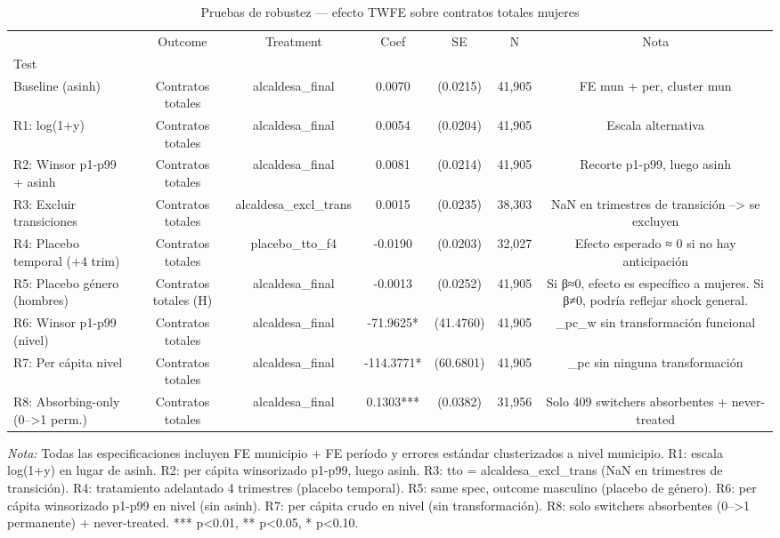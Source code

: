 \begin{table}[htbp]
\centering
\small
\caption{Pruebas de robustez — efecto TWFE sobre contratos totales mujeres}
\label{tab:robustness}
\begin{tabular}{lcccccc}
\toprule
 & Outcome & Treatment & Coef & SE & N & Nota \\
Test &  &  &  &  &  &  \\
\midrule
Baseline (asinh) & Contratos totales & alcaldesa\_final & 0.0070 & (0.0215) & 41,905 & FE mun + per, cluster mun \\
R1: log(1+y) & Contratos totales & alcaldesa\_final & 0.0054 & (0.0204) & 41,905 & Escala alternativa \\
R2: Winsor p1-p99 + asinh & Contratos totales & alcaldesa\_final & 0.0081 & (0.0214) & 41,905 & Recorte p1-p99, luego asinh \\
R3: Excluir transiciones & Contratos totales & alcaldesa\_excl\_trans & 0.0015 & (0.0235) & 38,303 & NaN en trimestres de transición --> se excluyen \\
R4: Placebo temporal (+4 trim) & Contratos totales & placebo\_tto\_f4 & -0.0190 & (0.0203) & 32,027 & Efecto esperado ≈ 0 si no hay anticipación \\
R5: Placebo género (hombres) & Contratos totales (H) & alcaldesa\_final & -0.0013 & (0.0252) & 41,905 & Si β≈0, efecto es específico a mujeres. Si β≠0, podría reflejar shock general. \\
R6: Winsor p1-p99 (nivel) & Contratos totales & alcaldesa\_final & -71.9625* & (41.4760) & 41,905 & _pc_w sin transformación funcional \\
R7: Per cápita nivel & Contratos totales & alcaldesa\_final & -114.3771* & (60.6801) & 41,905 & _pc sin ninguna transformación \\
R8: Absorbing-only (0-->1 perm.) & Contratos totales & alcaldesa\_final & 0.1303*** & (0.0382) & 31,956 & Solo 409 switchers absorbentes + never-treated \\
\bottomrule
\end{tabular}
\vspace{2mm}
\parbox{\textwidth}{\footnotesize \textit{Nota:} Todas las especificaciones incluyen FE municipio + FE período y errores estándar clusterizados a nivel municipio. R1: escala log(1+y) en lugar de asinh. R2: per cápita winsorizado p1-p99, luego asinh. R3: tto = alcaldesa\_excl\_trans (NaN en trimestres de transición). R4: tratamiento adelantado 4 trimestres (placebo temporal). R5: same spec, outcome masculino (placebo de género). R6: per cápita winsorizado p1-p99 en nivel (sin asinh). R7: per cápita crudo en nivel (sin transformación). R8: solo switchers absorbentes (0-->1 permanente) + never-treated. *** p<0.01, ** p<0.05, * p<0.10.}
\end{table}
